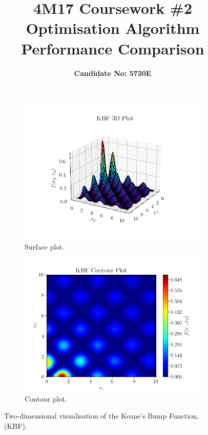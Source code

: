 \documentclass[10pt]{article}
\title{\textbf{4M17 Coursework \#2 \\ Optimisation Algorithm Performance Comparison}}
\author{\textbf{Candidate No: 5730E}}
\begin{document}
\maketitle
\begin{multicols}{2}\begin{figure}[H]
    \centering
    \begin{subfigure}{0.49\textwidth}
        \centering
        \includegraphics[width=\textwidth]{../figures/KBF/KBF_surf.png}
        \caption{Surface plot.}
        \label{fig:KBF_surf}
    \end{subfigure}
    \begin{subfigure}{0.49\textwidth}
        \centering
        \includegraphics[width=\textwidth]{../figures/KBF/KBF_contour.png}
        \caption{Contour plot.}
        \label{fig:KBF_contour}
    \end{subfigure}
        \captionsetup{justification=centering}
        \caption{Two-dimensional visualisation of the Keane's Bump Function, (KBF).}
        \label{fig:KBF_2D}
\end{figure}


\end{multicols}
\end{document}
